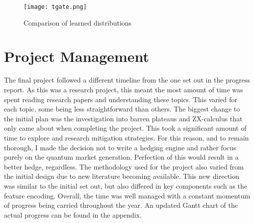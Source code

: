 \documentclass[12pt]{article}
\numberwithin{equation}{section}
\begin{document}
\begin{figure}[h!]
    \centering
    \texttt{[image: tgate.png]}
    \caption{Comparison of learned distributions}
\end{figure}


\newpage 
\section{Project Management}
The final project followed a different timeline from the one set out in the 
progress report. As this was a research project, this meant the most amount of 
time was spent reading research papers and understanding these topics. This varied 
for each topic, some being less straightforward than others.
The biggest change to the initial plan was the investigation into barren plateaus 
and ZX-calculus that only came about when completing the project. This took a 
significant amount of time to explore and research mitigation strategies. 
For this reason,
and to remain thorough, I made the decision not to write a hedging engine and rather 
focus purely on the quantum market generation. Perfection of this would result in 
a better hedge, regardless. The methodology used for the project also varied from 
the initial design due to new literature becoming available. This new direction 
was similar to the initial set out, but also differed in key components such as 
the feature encoding. Overall, the time was well managed with a constant 
momentum of progress being carried throughout the year. 
An updated Gantt chart of the actual progress 
can be found in the appendix.  
\newpage
\end{document}
